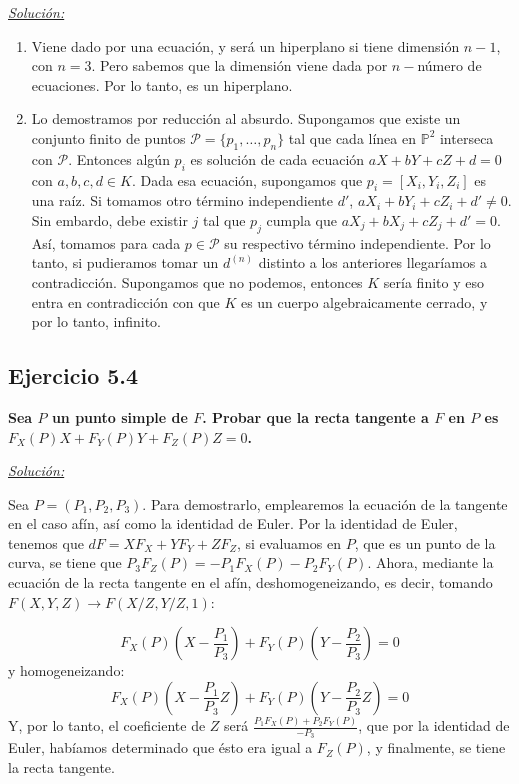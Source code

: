 \underline{\textit{Solución:}}

\begin{enumerate}
\item Viene dado por una ecuación, y será un hiperplano si tiene dimensión $n-1$, con $n=3$. Pero sabemos que la dimensión viene dada por $n-$número de ecuaciones. Por lo tanto, es un hiperplano.
  
\item Lo demostramos por reducción al absurdo. Supongamos que existe un conjunto finito de puntos $\mathcal{P}=\{p_1,\dots ,p_n\}$ tal que cada línea en $\mathbb{P}^2$ interseca con $\mathcal{P}$. Entonces algún $p_i$ es solución de cada ecuación $aX+bY+cZ+d=0$ con $a,b,c,d\in K$. Dada esa ecuación, supongamos que $p_i=[X_i,Y_i,Z_i]$ es una raíz. Si tomamos otro término independiente $d'$, $aX_i+bY_i+cZ_i+d'\neq 0$. Sin embardo, debe existir $j$ tal que $p_j$ cumpla que $aX_j+bX_j+cZ_j+d'=0$. Así, tomamos para cada $p\in \mathcal{P}$ su respectivo término independiente. Por lo tanto, si pudieramos tomar un $d^{(n)}$ distinto a los anteriores llegaríamos a contradicción. Supongamos que no podemos, entonces $K$ sería finito y eso entra en contradicción con que $K$ es un cuerpo algebraicamente cerrado, y por lo tanto, infinito. 
\end{enumerate}

\subsection{Ejercicio 5.4}

\textbf{Sea $P$ un punto simple de $F$. Probar que la recta tangente a $F$ en $P$ es $F_X(P)X+F_Y(P)Y+F_Z(P)Z=0$.}

\underline{\textit{Solución:}}

Sea $P=(P_1,P_2,P_3)$. Para demostrarlo, emplearemos la ecuación de la tangente en el caso afín, así como la identidad de Euler. Por la identidad de Euler, tenemos que $dF=XF_X+YF_Y+ZF_Z$, si evaluamos en $P$, que es un punto de la curva, se tiene que $P_3F_Z(P)=-P_1F_X(P)-P_2F_Y(P)$. Ahora, mediante la ecuación de la recta tangente en el afín, deshomogeneizando, es decir, tomando $F(X,Y,Z)\rightarrow F(X/Z,Y/Z,1)$:

$$F_X(P)(X-\frac{P_1}{P_3})+F_Y(P)(Y-\frac{P_2}{P_3})=0$$
y homogeneizando:
$$F_X(P)(X-\frac{P_1}{P_3}Z)+F_Y(P)(Y-\frac{P_2}{P_3}Z)=0$$
Y, por lo tanto, el coeficiente de $Z$ será $\frac{P_1F_X(P)+P_2F_Y(P)}{-P_3}$, que por la identidad de Euler, habíamos determinado que ésto era igual a $F_Z(P)$, y finalmente, se tiene la recta tangente. 


